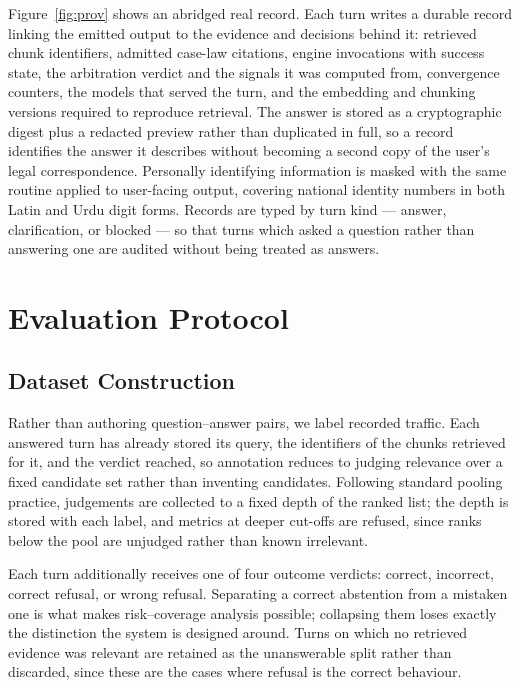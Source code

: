 \documentclass[conference]{IEEEtran}
\begin{document}
\label{sec:prov}
Figure~\ref{fig:prov} shows an abridged real record.
Each turn writes a durable record linking the emitted output to the evidence and
decisions behind it: retrieved chunk identifiers, admitted case-law citations,
engine invocations with success state, the arbitration verdict and the signals
it was computed from, convergence counters, the models that served the turn, and
the embedding and chunking versions required to reproduce retrieval. The answer
is stored as a cryptographic digest plus a redacted preview rather than
duplicated in full, so a record identifies the answer it describes without
becoming a second copy of the user's legal correspondence. Personally
identifying information is masked with the same routine applied to user-facing
output, covering national identity numbers in both Latin and Urdu digit forms.
Records are typed by turn kind --- answer, clarification, or blocked --- so that
turns which asked a question rather than answering one are audited without being
treated as answers.

\section{Evaluation Protocol}
\label{sec:eval}

\subsection{Dataset Construction}
Rather than authoring question--answer pairs, we label recorded traffic. Each
answered turn has already stored its query, the identifiers of the chunks
retrieved for it, and the verdict reached, so annotation reduces to judging
relevance over a fixed candidate set rather than inventing candidates. Following
standard pooling practice, judgements are collected to a fixed depth of the
ranked list; the depth is stored with each label, and metrics at deeper cut-offs
are refused, since ranks below the pool are unjudged rather than known
irrelevant.

Each turn additionally receives one of four outcome verdicts: correct,
incorrect, correct refusal, or wrong refusal. Separating a correct abstention
from a mistaken one is what makes risk--coverage analysis possible; collapsing
them loses exactly the distinction the system is designed around. Turns on which
no retrieved evidence was relevant are retained as the unanswerable split rather
than discarded, since these are the cases where refusal is the correct
behaviour.
\end{document}
